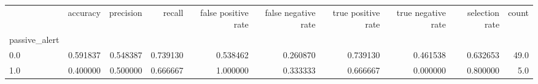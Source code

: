 \begin{tabular}{lrrrrrrrrr}
\toprule
{} &  accuracy &  precision &    recall &  false positive rate &  false negative rate &  true positive rate &  true negative rate &  selection rate &  count \\
passive\_alert &           &            &           &                      &                      &                     &                     &                 &        \\
\midrule
0.0           &  0.591837 &   0.548387 &  0.739130 &             0.538462 &             0.260870 &            0.739130 &            0.461538 &        0.632653 &   49.0 \\
1.0           &  0.400000 &   0.500000 &  0.666667 &             1.000000 &             0.333333 &            0.666667 &            0.000000 &        0.800000 &    5.0 \\
\bottomrule
\end{tabular}
